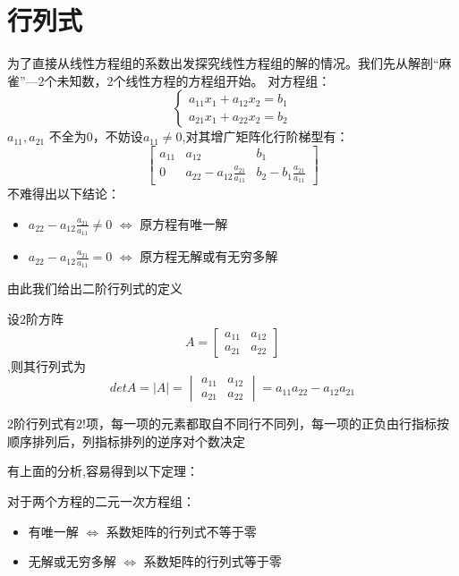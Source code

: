 \chapter{行列式}
为了直接从线性方程组的系数出发探究线性方程组的解的情况。我们先从解剖“麻雀”---2个未知数，2个线性方程的方程组开始。
对方程组：
\begin{equation*}
    \begin{cases}
        a_{11}x_1 + a_{12}x_2 = b_1\\
         a_{21}x_1 + a_{22}x_2 = b_2
     \end{cases}
\end{equation*}
\(a_{11},a_{21}\) 不全为0，不妨设$a_{11} \neq 0$,对其增广矩阵化行阶梯型有：
\begin{equation*}
    \begin{bmatrix}
        a_{11} & a_{12} & b_{1} \\
        0   &   a_{22}-a_{12}\frac{a_{21}}{a_{11}}  &   b_{2}-b_{1}\frac{a_{21}}{a_{11}}
    \end{bmatrix}
\end{equation*}
不难得出以下结论：
\begin{itemize}
    \item $a_{22}-a_{12}\frac{a_{21}}{a_{11}} \neq 0$ $\Leftrightarrow$ 原方程有唯一解
    \item $a_{22}-a_{12}\frac{a_{21}}{a_{11}} = 0$ $\Leftrightarrow$ 原方程无解或有无穷多解
\end{itemize}
由此我们给出二阶行列式的定义
\begin{definition}
    设$2$阶方阵
    \begin{equation*}
        A = \begin{bmatrix}
            a_{11} & a_{12}\\
            a_{21} & a_{22}
        \end{bmatrix}
    \end{equation*}
    ,则其行列式为
    \begin{equation*}
        det A=|A| = \begin{vmatrix}
            a_{11} & a_{12}\\
            a_{21} & a_{22}
        \end{vmatrix}
        = a_{11}a_{22} - a_{12}a_{21}
    \end{equation*}
\end{definition}
\begin{remark}
    $2$阶行列式有$2!$项，每一项的元素都取自不同行不同列，每一项的正负由行指标按顺序排列后，列指标排列的逆序对个数决定
\end{remark}
有上面的分析,容易得到以下定理：
\begin{theorem}
    对于两个方程的二元一次方程组：
    \begin{itemize}
        \item 有唯一解 $\Leftrightarrow$ 系数矩阵的行列式不等于零
        \item 无解或无穷多解 $\Leftrightarrow$ 系数矩阵的行列式等于零
    \end{itemize}
\end{theorem}

